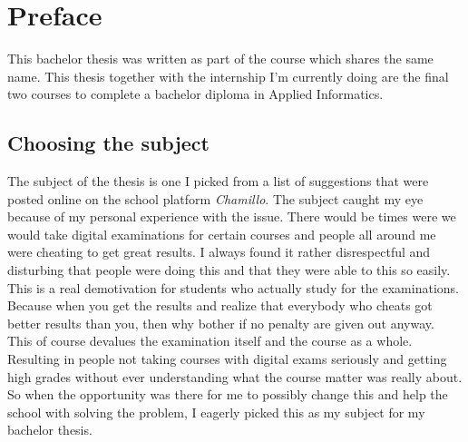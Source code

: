 
\chapter*{Preface}
\label{ch:voorwoord}


This bachelor thesis was written as part of the course which shares the same name. This thesis together with the internship I'm currently doing are the final two courses to complete a bachelor diploma in Applied Informatics.
\section*{Choosing the subject}
The subject of the thesis is one I picked from a list of suggestions that were posted online on the school platform \textit{Chamillo}. The subject caught my eye because of my personal experience with the issue. There would be times were we would take digital examinations for certain courses and people all around me were cheating to get great results. I always found it rather disrespectful and disturbing that people were doing this and that they were able to this so easily. This is a real demotivation for students who actually study for the examinations. Because when you get the results and realize that everybody who cheats got better results than you, then why bother if no penalty are given out anyway.\\
This of course devalues the examination itself and the course as a whole. Resulting in people not taking courses with digital exams seriously and getting high grades without ever understanding what the course matter was really about.\\
So when the opportunity was there for me to possibly change this and help the school with solving the problem, I eagerly picked this as my subject for my bachelor thesis.